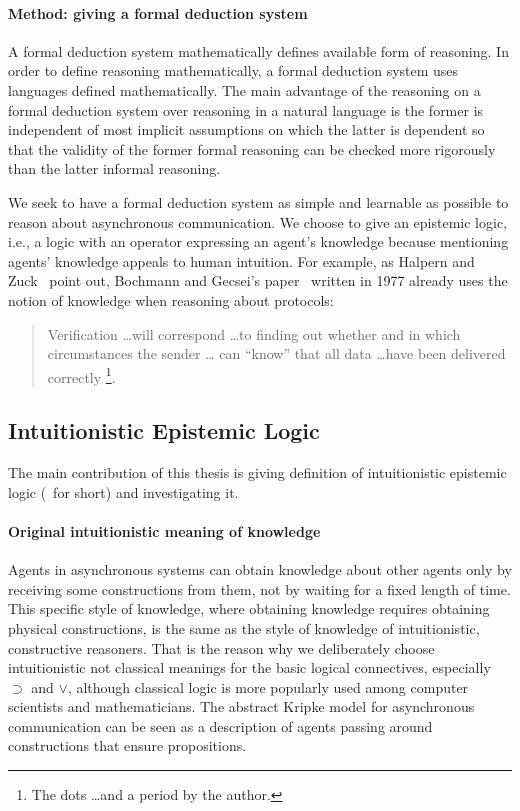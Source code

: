     \paragraph{Method: giving a formal deduction system}
    A formal deduction system mathematically defines
    available form of reasoning.
    In order to define reasoning mathematically,
    a formal deduction system uses languages defined mathematically.
    The main advantage of the reasoning on a formal deduction system over
    reasoning in a natural language
    is the former is independent of most implicit assumptions
    on which the latter is dependent so that
    the validity of the former formal reasoning can be checked more rigorously
    than the latter informal reasoning.

    We seek to have a formal
    deduction system as simple and learnable as possible to reason about asynchronous
    communication.
    We choose to give an epistemic logic, i.e., a logic with an operator expressing an agent's
    knowledge because mentioning agents' knowledge appeals to
    human intuition.
    For example, as Halpern and Zuck~\cite{halpern1992little}
    point out, Bochmann and Gecsei's paper~\cite{bochmann} written in 1977 already uses
    the notion of knowledge when reasoning about protocols:
    \begin{quotation}
     \noindent
     Verification \ldots will correspond
     \ldots to finding out whether and in
     which circumstances the sender \ldots
     can ``know'' that all data \ldots have been delivered correctly%
     \footnote{The dots \ldots and a period by the author.}.
    \end{quotation}

  \subsection{Intuitionistic Epistemic Logic}

  The main contribution of this thesis is giving definition of
  intuitionistic epistemic logic (\iec\, for short) and investigating it.

    \paragraph{Original intuitionistic meaning of knowledge}
    Agents in asynchronous systems can
    obtain knowledge about other agents only by receiving some constructions from them,
    not by waiting for a fixed length of time.
    This specific style of knowledge, where
    obtaining knowledge requires obtaining physical constructions,
    is the same as the style of knowledge of intuitionistic, constructive reasoners.
    That is the reason why we deliberately choose intuitionistic not classical meanings for
    the basic logical connectives, especially $\supset$ and $\vee$, although classical logic
    is more popularly used among computer scientists and mathematicians.
    The abstract Kripke model for asynchronous communication
    can be seen as a description of agents passing around constructions that ensure
    propositions.

